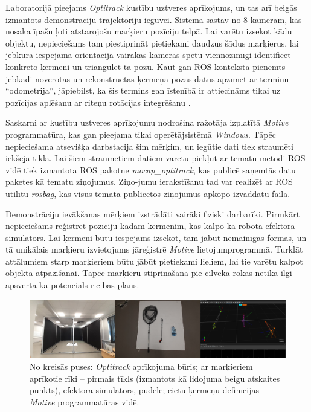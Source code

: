 \documentclass[12pt, a4paper]{article}
\numberwithin{equation}{section} %
\begin{document}
Laboratorijā pieejams \textit{Optitrack} kustību uztveres aprīkojums, un tas arī beigās izmantots demonstrāciju trajektoriju ieguvei. Sistēma sastāv no 8 kamerām, kas nosaka īpašu ļoti atstarojošu marķieru pozīciju telpā. Lai varētu izsekot kādu objektu, nepieciešams tam piestiprināt pietiekami daudzus šādus marķierus, lai jebkurā iespējamā orientācijā vairākas kameras spētu viennozīmīgi identificēt konkrēto ķermeni un triangulēt tā pozu. Kaut gan ROS kontekstā pieņemts jebkādi novērotas un rekonstruētas ķermeņa pozas datus apzīmēt ar terminu ``odometrija'', jāpiebilst, ka šis termins gan īstenībā ir attiecināms tikai uz pozīcijas aplēšanu ar riteņu rotācijas integrēšanu \cite{odometry}.

Saskarni ar kustību uztveres aprīkojumu nodrošina ražotāja izplatītā \textit{Motive} programmatūra, kas gan pieejama tikai operētājsistēmā \textit{Windows}. Tāpēc nepieciešama atsevišķa darbstacija šim mērķim, un iegūtie dati tiek straumēti iekšējā tīklā. Lai šiem straumētiem datiem varētu piekļūt ar tematu metodi ROS vidē tiek izmantota ROS pakotne \textit{mocap\_optitrack}, kas publicē saņemtās datu paketes kā tematu ziņojumus. Ziņo-jumu ierakstīšanu tad var realizēt ar ROS utilītu \textit{rosbag}, kas visus tematā publicētos ziņojumus apkopo izvaddatu failā.

Demonstrāciju ievākšanas mērķiem izstrādāti vairāki fiziski darbarīki. Pirmkārt nepieciešams reģistrēt pozīciju kādam ķermenim, kas kalpo kā robota efektora simulators. Lai ķermeni būtu iespējams izsekot, tam jābūt nemainīgas formas, un tā unikālais marķieru izvietojums jāreģistrē \textit{Motive} lietojumprogrammā. Turklāt attālumiem starp marķieriem būtu jābūt pietiekami lieliem, lai tie varētu kalpot objekta atpazīšanai. Tāpēc marķieru stiprināšana pie cilvēka rokas netika ilgi apsvērta kā potenciāls rīcības plāns. 

\begin{figure}[t!]
    \centering
    \includegraphics[width=16cm,page=1]{../img/mocap_equipment.jpg}
    \caption{No kreisās puses: \textit{Optitrack} aprīkojuma būris; ar marķieriem aprīkotie rīki -- pirmais tīkls (izmantots kā lidojuma beigu atskaites punkts), efektora simulators, pudele; cietu ķermeņu definīcijas \textit{Motive} programmatūras vidē.}
\end{figure}
\end{document}
